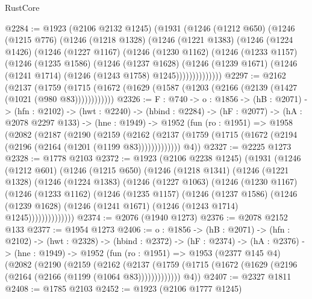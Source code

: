 \begin{lexlean}{RustCore}
\begin{coremodule}
@2284 := @1923
    (@2106 @2132 @1245)
    (@1931
      (@1246
        (@1212 @650)
        (@1246
          (@1215 @776)
          (@1246
            (@1218 @1328)
            (@1246
              (@1221 @1383)
              (@1246
                (@1224 @1426)
                (@1246
                  (@1227 @1167)
                  (@1246
                    (@1230 @1162)
                    (@1246
                      (@1233 @1157)
                      (@1246
                        (@1235 @1586)
                        (@1246
                          (@1237 @1628)
                          (@1246
                            (@1239 @1671)
                            (@1246 (@1241 @1714) (@1246 (@1243 @1758) @1245))))))))))))))
@2297 := @2162
    (@2137
      (@1759 (@1715 (@1672 (@1629 (@1587 (@1203 (@2166 (@2139 (@1427 (@1021 (@980 @83))))))))))))
@2326 := {F : @740} ->
  {o : @1856} ->
  (hB : @2071) ->
  (hfn : @2102) ->
  (hwt : @2240) ->
  (hbind : @2284) ->
  (hF : @2077) ->
  (hA : @2078 @2297 @133) ->
  (hne : @1949) ->
  @1952
    (fun (ro : @1951) =>
    @1958
      (@2082
        (@2187
          (@2190
            (@2159
              (@2162 (@2137 (@1759 (@1715 (@1672 (@2194 (@2196 (@2164 (@1201 (@1199 @83)))))))))))))
        @4))
@2327 := @2225 @1273
@2328 := @1778 @2103
@2372 := @1923
    (@2106 @2238 @1245)
    (@1931
      (@1246
        (@1212 @601)
        (@1246
          (@1215 @650)
          (@1246
            (@1218 @1341)
            (@1246
              (@1221 @1328)
              (@1246
                (@1224 @1383)
                (@1246
                  (@1227 @1063)
                  (@1246
                    (@1230 @1167)
                    (@1246
                      (@1233 @1162)
                      (@1246
                        (@1235 @1157)
                        (@1246
                          (@1237 @1586)
                          (@1246
                            (@1239 @1628)
                            (@1246 (@1241 @1671) (@1246 (@1243 @1714) @1245))))))))))))))
@2374 := @2076 (@1940 @1273)
@2376 := @2078 @2152 @133
@2377 := @1954 @1273
@2406 := {o : @1856} ->
  (hB : @2071) ->
  (hfn : @2102) ->
  (hwt : @2328) ->
  (hbind : @2372) ->
  (hF : @2374) ->
  (hA : @2376) ->
  (hne : @1949) ->
  @1952
    (fun (ro : @1951) =>
    @1953
      (@2377 @145 @4)
      (@2082
        (@2190
          (@2159
            (@2162
              (@2137 (@1759 (@1715 (@1672 (@1629 (@2196 (@2164 (@2166 (@1199 (@1064 @83)))))))))))))
        @4))
@2407 := @2327 @1811
@2408 := @1785 @2103
@2452 := @1923
    (@2106 @1777 @1245)

\end{coremodule}
\end{lexlean}
